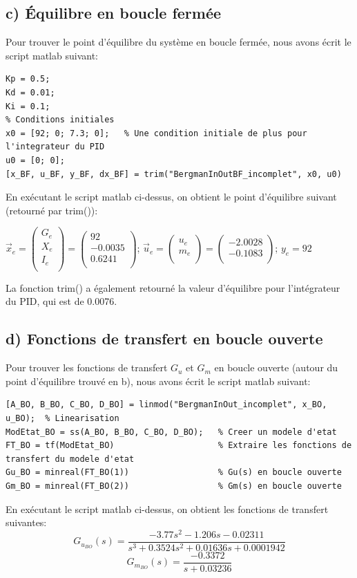 \documentclass[11pt, a4paper]{article}
\begin{document}
\subsection*{c) Équilibre en boucle fermée}
Pour trouver le point d'équilibre du système en boucle fermée, nous avons écrit le script matlab suivant:
\begin{lstlisting}[style=matlab]
% On suppose que les valeurs des constantes du PID sont les suivantes
Kp = 0.5;
Kd = 0.01;
Ki = 0.1;
% Conditions initiales 
x0 = [92; 0; 7.3; 0];   % Une condition initiale de plus pour l'integrateur du PID
u0 = [0; 0];
[x_BF, u_BF, y_BF, dx_BF] = trim("BergmanInOutBF_incomplet", x0, u0)
\end{lstlisting}
En exécutant le script matlab ci-dessus, on obtient le point d'équilibre suivant (retourné par trim()):\newline 
\begin{center}
$\vec{x}_e=\begin{pmatrix}
G_e \\
X_e \\
I_e \\ 
\end{pmatrix}=
\begin{pmatrix}
92 \\
-0.0035 \\
0.6241 \\
\end{pmatrix}$; $\vec{u}_e=\begin{pmatrix}
u_e \\
m_e \\
\end{pmatrix}=\begin{pmatrix}
-2.0028 \\
-0.1083 \\
\end{pmatrix}$; $y_e=92$
\end{center}
La fonction trim() a également retourné la valeur d'équilibre pour l'intégrateur du PID, qui est de 0.0076.
\subsection*{d) Fonctions de transfert en boucle ouverte}
Pour trouver les fonctions de transfert $G_u$ et $G_m$ en boucle ouverte (autour du point d'équilibre trouvé en b), nous avons écrit le script matlab suivant:
\begin{lstlisting}[style=matlab]
[A_BO, B_BO, C_BO, D_BO] = linmod("BergmanInOut_incomplet", x_BO, u_BO);  % Linearisation
ModEtat_BO = ss(A_BO, B_BO, C_BO, D_BO);   % Creer un modele d'etat 
FT_BO = tf(ModEtat_BO)                     % Extraire les fonctions de transfert du modele d'etat
Gu_BO = minreal(FT_BO(1))                  % Gu(s) en boucle ouverte 
Gm_BO = minreal(FT_BO(2))                  % Gm(s) en boucle ouverte
\end{lstlisting}
En exécutant le script matlab ci-dessus, on obtient les fonctions de transfert suivantes: 
$$\boxed{G_{u_{BO}}(s)=\frac{-3.77s^2-1.206s-0.02311}{s^3+0.3524s^2+0.01636s+0.0001942}}$$
$$\boxed{G_{m_{BO}}(s)=\frac{-0.3372}{s+0.03236}}$$
\end{document}
